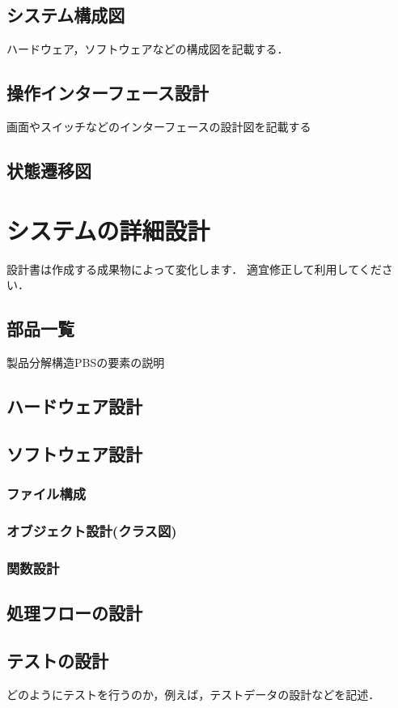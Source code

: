 \documentclass[lualatex,book,paper=a4paper,jafontsize=11.5pt,jafontscale=1.05]{jlreq}
\begin{document}
\section{システム構成図}
ハードウェア，ソフトウェアなどの構成図を記載する．

\section{操作インターフェース設計}
画面やスイッチなどのインターフェースの設計図を記載する

\section{状態遷移図}


\chapter{システムの詳細設計}

設計書は作成する成果物によって変化します．
適宜修正して利用してください．


\section{部品一覧}
製品分解構造PBSの要素の説明

\section{ハードウェア設計}

\section{ソフトウェア設計}

\subsection{ファイル構成}

\subsection{オブジェクト設計(クラス図)}

\subsection{関数設計}


\section{処理フローの設計}


\section{テストの設計}
どのようにテストを行うのか，例えば，テストデータの設計などを記述．
\end{document}
